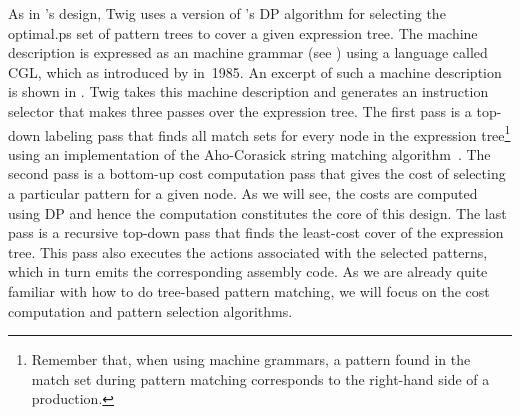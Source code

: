 {As in \citeauthor{Ripken1977}'s design, \gls{Twig} uses a version of
\citeauthor{Aho1976a}'s \gls{DP} algorithm for selecting the \gls{optimal.ps}
set of \glspl{pattern tree} to cover a given \gls{expression tree}.
%
The
\gls{machine description} is expressed as an \gls{machine grammar} (see
) using a language called \gls{CGL}, which as
introduced by \textcite{Aho1985} in~1985.
%
An excerpt of such a \gls{machine
  description} is shown in .
%
\Gls{Twig} takes this
\gls{machine description} and generates an \gls{instruction selector} that makes
three passes over the \gls{expression tree}.
%
The first pass is a top-down labeling
pass that finds all \glspl{match set} for every \gls{node} in the \gls{expression tree}\footnote{Remember that, when using \glspl{machine grammar}, a
  \gls{pattern} found in the \gls{match set} during \gls{pattern matching}
  corresponds to the right-hand side of a \gls{production}.} using an
implementation of the Aho-Corasick string matching algorithm~\cite{Aho1975}.
%
The
second pass is a bottom-up cost computation pass that gives the cost of
selecting a particular \gls{pattern} for a given \gls{node}.
%
As we will see, the
costs are computed using \gls{DP} and hence the computation constitutes the core
of this design.
%
The last pass is a recursive top-down pass that finds the
least-cost cover of the \gls{expression tree}.
%
This pass also executes the
\glspl{action} associated with the selected \glspl{pattern}, which in turn emits
the corresponding \gls{assembly code}.
%
 As we are already quite familiar with
how to do \gls{tree}-based \gls{pattern matching}, we will focus on the cost
computation and \gls{pattern selection} algorithms.

}
